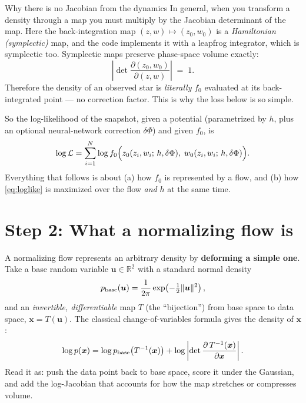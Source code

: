 \documentclass[11pt]{article}
\begin{document}
\begin{keybox}{Why there is no Jacobian from the dynamics}
In general, when you transform a density through a map you must multiply by the
Jacobian determinant of the map. Here the back-integration map
$(z,w)\mapsto(z_0,w_0)$ is a \emph{Hamiltonian (symplectic)} map, and the code
implements it with a leapfrog integrator, which is symplectic too. Symplectic maps
preserve phase-space volume exactly:
\[
\left|\det \frac{\partial(z_0,w_0)}{\partial(z,w)}\right| \;=\; 1 .
\]
Therefore the density of an observed star is \emph{literally} $f_0$ evaluated at its
back-integrated point --- no correction factor. This is why the loss below is so simple.
\end{keybox}

So the log-likelihood of the snapshot, given a potential (parametrized by $h$, plus an
optional neural-network correction $\delta\Phi$) and given $f_0$, is
\begin{equation}
\log \mathcal{L}
= \sum_{i=1}^{N} \log f_0\Bigl( z_0(z_i,w_i;\, h,\delta\Phi),\;
                                 w_0(z_i,w_i;\, h,\delta\Phi) \Bigr).
\label{eq:loglike}
\end{equation}
Everything that follows is about (a) how $f_0$ is represented by a flow, and
(b) how \eqref{eq:loglike} is maximized over the flow \emph{and} $h$ at the same time.

\section{Step 2: What a normalizing flow is}

A normalizing flow represents an arbitrary density by \textbf{deforming a simple one}.
Take a base random variable $\bm u \in \mathbb{R}^2$ with a standard normal density
\[
p_{\rm base}(\bm u) = \frac{1}{2\pi} \exp\!\left(-\tfrac12 \|\bm u\|^2\right),
\]
and an \emph{invertible, differentiable} map $T$ (the ``bijection'') from base space to
data space, $\bm x = T(\bm u)$. The classical change-of-variables formula gives the
density of $\bm x$:
\begin{equation}
\log p(\bm x)
= \log p_{\rm base}\bigl(T^{-1}(\bm x)\bigr)
+ \log \left| \det \frac{\partial\, T^{-1}(\bm x)}{\partial \bm x} \right| .
\label{eq:cov}
\end{equation}
Read it as: push the data point back to base space, score it under the Gaussian, and
add the log-Jacobian that accounts for how the map stretches or compresses volume.
\end{document}
